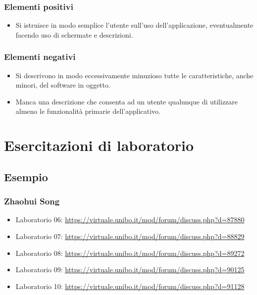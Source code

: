 \documentclass[a4paper,12pt]{report}
\begin{document}
\subsection*{Elementi positivi}

\begin{itemize}
 \item Si istruisce in modo semplice l'utente sull'uso dell'applicazione, eventualmente facendo uso di schermate e descrizioni.
\end{itemize}

\subsection*{Elementi negativi}
\begin{itemize}
 \item Si descrivono in modo eccessivamente minuzioso tutte le caratteristiche, anche minori, del software in oggetto.
 \item Manca una descrizione che consenta ad un utente qualunque di utilizzare almeno le funzionalità primarie dell'applicativo.
\end{itemize}

\chapter{Esercitazioni di laboratorio}


\section*{Esempio}

\subsection{Zhaohui Song}

\begin{itemize}
 \item Laboratorio 06: \url{https://virtuale.unibo.it/mod/forum/discuss.php?d=87880}
 \item Laboratorio 07: \url{https://virtuale.unibo.it/mod/forum/discuss.php?d=88829}
 \item Laboratorio 08: \url{https://virtuale.unibo.it/mod/forum/discuss.php?d=89272}
 \item Laboratorio 09: \url{https://virtuale.unibo.it/mod/forum/discuss.php?d=90125}
 \item Laboratorio 10: \url{https://virtuale.unibo.it/mod/forum/discuss.php?d=91128}

\end{itemize}




\end{document}
